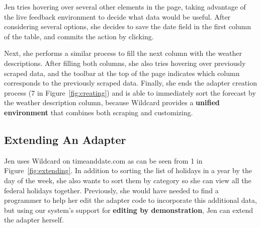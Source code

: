 \documentclass[sigconf,10pt]{acmart}
\begin{document}
Jen tries hovering over several other elements in the page, taking
advantage of the live feedback environment to decide what data would be
useful. After considering several options, she decides to save the date
field in the first column of the table, and commits the action by
clicking.

Next, she performs a similar process to fill the next column with the
weather descriptions. After filling both columns, she also tries
hovering over previously scraped data, and the toolbar at the top of the
page indicates which column corresponds to the previously scraped data.
Finally, she ends the adapter creation process (7 in
Figure~\ref{fig:creating}) and is able to immediately sort the forecast
by the weather description column, because Wildcard provides a
\textbf{unified environment} that combines both scraping and
customizing.

\hypertarget{extending-an-adapter}{%
\subsection{Extending An Adapter}\label{extending-an-adapter}}

Jen uses Wildcard on timeanddate.com as can be seen from 1 in
Figure~\ref{fig:extending}. In addition to sorting the list of holidays
in a year by the day of the week, she also wants to sort them by
category so she can view all the federal holidays together. Previously,
she would have needed to find a programmer to help her edit the adapter
code to incorporate this additional data, but using our system's support
for \textbf{editing by demonstration}, Jen can extend the adapter
herself.
\end{document}
